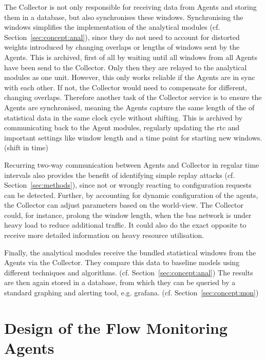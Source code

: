 The Collector is not only responsible for receiving data from Agents and storing them in a database, but also synchronises these windows. Synchronising the windows simplifies the implementation of the analytical modules (cf. Section~\ref{sec:concept:anal}), since they do not need to account for distorted weights introduced by changing overlaps or lengths of windows sent by the Agents.
This is archived, first of all by waiting until all windows from all Agents have been send to the Collector. Only then they are relayed to the analytical modules as one unit.
However, this only works reliable if the Agents are in sync with each other. If not, the Collector would need to compensate for different, changing overlaps. Therefore another task of the Collector service is to ensure the Agents are synchronised, meaning the Agents capture the same length of the of statistical data in the same clock cycle without shifting.
This is archived by communicating back to the Agent modules, regularly updating the \gls{rtc} and important settings like window length and a time point for starting new windows. (shift in time)

Recurring two-way communication between Agents and Collector in regular time intervals also provides the benefit of identifying simple replay attacks (cf. Section~\ref{sec:methods}), since not or wrongly reacting to configuration requests can be detected.
Further, by accounting for dynamic configuration of the agents, the Collector can adjust parameters based on the world-view.
The Collector could, for instance, prolong the window length, when the \gls{bas} network is under heavy load to reduce additional traffic. It could also do the exact opposite to receive more detailed information on heavy resource utilisation.

Finally, the analytical modules receive the bundled statistical windows from the Agents via the Collector. They compare this data to baseline models using different techniques and algorithms. (cf. Section~\ref{sec:concept:anal})
The results are then again stored in a database, from which they can be queried by a standard graphing and alerting tool, e.g. \gls{grafana}. (cf. Section~\ref{sec:concept:mon})


\section{Design of the Flow Monitoring Agents}
\label{sec:concept:agent}

